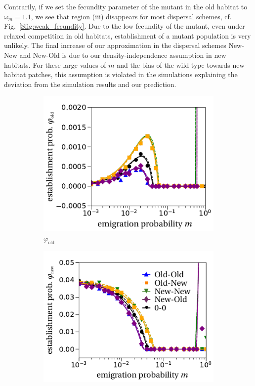 \documentclass[a4paper,11pt]{scrartcl}
\newcommand{\chg}[1]{\textcolor{change}{#1}}
\begin{document}
\chg{Contrarily, if we set the fecundity parameter of the mutant in the old habitat to $\omega_m=1.1$, we see that region (iii) disappears for most dispersal schemes, cf. Fig.~\ref{Sfig:weak_fecundity}. Due to the low fecundity of the mutant, even under relaxed competition in old habitats, establishment of a mutant population is very unlikely. The final increase of our approximation in the dispersal schemes New-New and New-Old is due to our density-independence assumption in new habitats. For these large values of $m$ and the bias of the wild type towards new-habitat patches, this assumption is violated in the simulations explaining the deviation from the simulation results and our prediction. }

\begin{figure}
	\centering
	 	\begin{subfigure}{.5\textwidth}
  		\centering
  		\includegraphics[width=\linewidth]{figS2a.pdf}
  		\caption{$\varphi_{\text{old}}$}
	\end{subfigure}%
	\begin{subfigure}{.5\textwidth}
 		 \centering
 		 \includegraphics[width=\linewidth]{figS2b.pdf}

\end{subfigure}
\end{figure}
\end{document}
